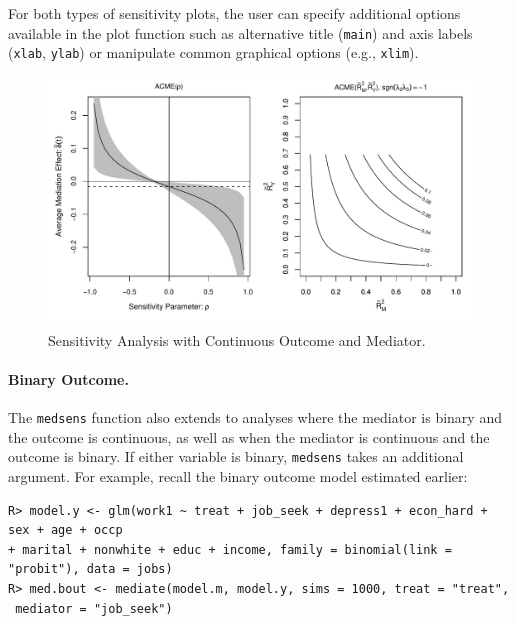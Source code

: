 \documentclass[11pt,letterpaper]{article}
\theoremstyle{plain}
\begin{document}
For both types of sensitivity plots, the user can specify additional options
available in the plot function such as alternative
title (\texttt{main}) and axis labels (\texttt{xlab}, \texttt{ylab}) or
manipulate common graphical options (e.g., \texttt{xlim}).



\begin{figure}[t]
\vspace{-.5in}
\begin{center}
\includegraphics[scale=.8]{Rho-R2-ContCont-JOBS.pdf}
\end{center}
\vspace{-.5in}
\caption{Sensitivity Analysis with Continuous Outcome and Mediator.
  \label{jobplot1}}
\end{figure}


\paragraph{Binary Outcome.}

The \texttt{medsens} function also extends to analyses where the
mediator is binary and the outcome is continuous, as well as when the
mediator is continuous and the outcome is binary.  If either variable
is binary, \texttt{medsens} takes an additional argument.  For
example, recall the binary outcome model estimated earlier:
\begin{verbatim}
R> model.y <- glm(work1 ~ treat + job_seek + depress1 + econ_hard + sex + age + occp
+ marital + nonwhite + educ + income, family = binomial(link = "probit"), data = jobs)
R> med.bout <- mediate(model.m, model.y, sims = 1000, treat = "treat",
 mediator = "job_seek")
\end{verbatim}
\end{document}
